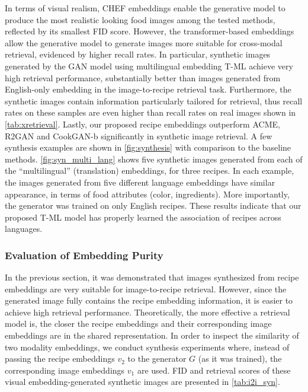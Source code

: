 \documentclass[sigconf,nonacm]{acmart}
\begin{document}
In terms of visual realism, CHEF embeddings enable the generative model to produce the most realistic looking food images among the tested methods, reflected by its smallest FID score. However, the transformer-based embeddings allow the generative model to generate images more suitable for cross-modal retrieval, evidenced by higher recall rates. In particular, synthetic images generated by the GAN model using multilingual embedding T-ML achieve very high retrieval performance, substantially better than images generated from English-only embedding in the image-to-recipe retrieval task. Furthermore, the synthetic images contain information particularly tailored for retrieval, thus recall rates on these samples are even higher than recall rates on real images shown in \autoref{tab:xretrieval}. Lastly, our proposed recipe embeddings outperform ACME, R2GAN and CookGAN-b significantly in synthetic image retrieval. A few synthesis examples are shown in \autoref{fig:synthesis} with comparison to the baseline methods. \autoref{fig:syn_multi_lang} shows five synthetic images generated from each of the ``multilingual'' (translation) embeddings, for three recipes. In each example, the images generated from five different language embeddings have similar appearance, in terms of food attributes (color, ingredients). More importantly, the generator was trained on only English recipes. These results indicate that our proposed T-ML model has properly learned the association of recipes across languages.


\subsubsection{\textbf{Evaluation of Embedding Purity}}

In the previous section, it was demonstrated that images synthesized from recipe embeddings are very suitable for image-to-recipe retrieval. However, since the generated image fully contains the recipe embedding information, it is easier to achieve high retrieval performance. Theoretically, the more effective a retrieval model is, the closer the recipe embeddings and their corresponding image embeddings are in the shared representation. In order to inspect the similarity of two modality embeddings, we conduct synthesis experiments where, instead of passing the recipe embeddings $v_2$ to the generator $G$ (as it was trained), the corresponding image embeddings $v_1$ are used. FID and retrieval scores of these visual embedding-generated synthetic images are presented in \autoref{tab:i2i_syn}.
\end{document}
